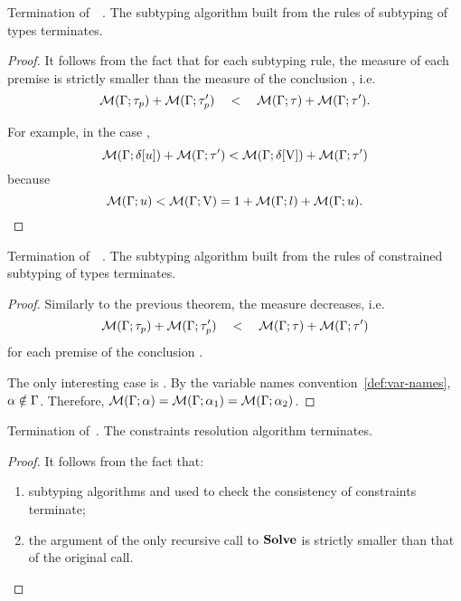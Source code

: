 \begin{theorem}{Termination of\ \ .}%
\label{thm:subty-terminates}
    The subtyping algorithm built from the rules of subtyping of types
     terminates.
\end{theorem}
\begin{proof}
    It follows from the fact that for each subtyping rule, 
    the measure of each premise 
    is strictly smaller than the measure 
    of the conclusion , i.e.
    \[\operatorname{\mathcal{M}}(\Gamma;\tau_p) + \operatorname{\mathcal{M}}(\Gamma;\tau'_p) \quad<\quad 
    \operatorname{\mathcal{M}}(\Gamma;\tau) + \operatorname{\mathcal{M}}(\Gamma;\tau').\]

    For example, in the case ,
    \[\operatorname{\mathcal{M}}(\Gamma;\delta[u]) + \operatorname{\mathcal{M}}(\Gamma;\tau') < 
    \operatorname{\mathcal{M}}(\Gamma;\delta[\mathrm{V}]) + \operatorname{\mathcal{M}}(\Gamma;\tau')\]
    because \[\operatorname{\mathcal{M}}(\Gamma;u) < \operatorname{\mathcal{M}}(\Gamma;\mathrm{V}) = 
        1 + \operatorname{\mathcal{M}}(\Gamma;l) + \operatorname{\mathcal{M}}(\Gamma;u).\]
\end{proof}

\begin{theorem}{Termination of\ \ .}%
\label{thm:subtyctr-terminates}
    The subtyping algorithm built from the rules of
    constrained subtyping of types
     terminates.
\end{theorem}
\begin{proof}
    Similarly to the previous theorem, the measure decreases, i.e.
    \[\operatorname{\mathcal{M}}(\Gamma;\tau_p) + \operatorname{\mathcal{M}}(\Gamma;\tau'_p) \quad<\quad 
    \operatorname{\mathcal{M}}(\Gamma;\tau) + \operatorname{\mathcal{M}}(\Gamma;\tau')\]
    for each premise 
    of the conclusion .
    
    The only interesting case is .
    By the variable names convention~\ref{def:var-names}, $\alpha \notin \Gamma$.
    Therefore, $\operatorname{\mathcal{M}}(\Gamma;\alpha) = \operatorname{\mathcal{M}}(\Gamma;\alpha_1) = \operatorname{\mathcal{M}}(\Gamma;\alpha_2)$.
\end{proof}

\begin{theorem}{Termination of\ \solvectrdflt.}%
\label{thm:solvectr-terminates}
    The constraints resolution algorithm \solvectrdflt terminates.
\end{theorem}
\begin{proof}
    It follows from the fact that:
    \begin{enumerate}
        \item subtyping algorithms  and 
             used to check the consistency of 
            constraints terminate;
        \item the argument \UEnv of the only recursive call to $\operatorname{\mathbf{Solve}}$
            is strictly smaller than that of the original call.
    \end{enumerate} 
\end{proof}


